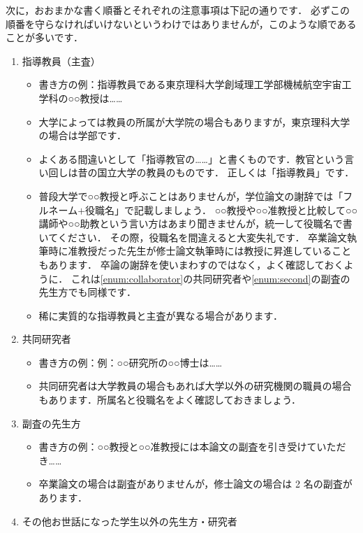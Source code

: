 次に，おおまかな書く順番とそれぞれの注意事項は下記の通りです．
必ずこの順番を守らなければいけないというわけではありませんが，このような順であることが多いです．
\begin{enumerate}
    \item 指導教員（主査）\label{enum:supervisor}
    \begin{itemize}
        \item 書き方の例：指導教員である東京理科大学創域理工学部機械航空宇宙工学科の○○教授は……
        \item 大学によっては教員の所属が大学院の場合もありますが，東京理科大学の場合は学部です．
        \item よくある間違いとして「指導教官の……」と書くものです．教官という言い回しは昔の国立大学の教員のものです．
        正しくは「指導教員」です．
        \item 普段大学で○○教授と呼ぶことはありませんが，学位論文の謝辞では「フルネーム$+$役職名」で記載しましょう．
        ○○教授や○○准教授と比較して○○講師や○○助教という言い方はあまり聞きませんが，統一して役職名で書いてください．
        その際，役職名を間違えると大変失礼です．
        卒業論文執筆時に准教授だった先生が修士論文執筆時には教授に昇進していることもあります．
        卒論の謝辞を使いまわすのではなく，よく確認しておくように．
        これは\ref{enum:collaborator}の共同研究者や\ref{enum:second}の副査の先生方でも同様です．
        \item 稀に実質的な指導教員と主査が異なる場合があります．
    \end{itemize}
    \item 共同研究者\label{enum:collaborator}
    \begin{itemize}
        \item 書き方の例：例：○○研究所の○○博士は……
        \item 共同研究者は大学教員の場合もあれば大学以外の研究機関の職員の場合もあります．所属名と役職名をよく確認しておきましょう．
    \end{itemize}
    \item 副査の先生方\label{enum:second}
    \begin{itemize}
        \item 書き方の例：○○教授と○○准教授には本論文の副査を引き受けていただき……
        \item 卒業論文の場合は副査がありませんが，修士論文の場合は 2 名の副査があります．
    \end{itemize}
    \item その他お世話になった学生以外の先生方・研究者
    \begin{itemize}

\end{itemize}
\end{enumerate}
